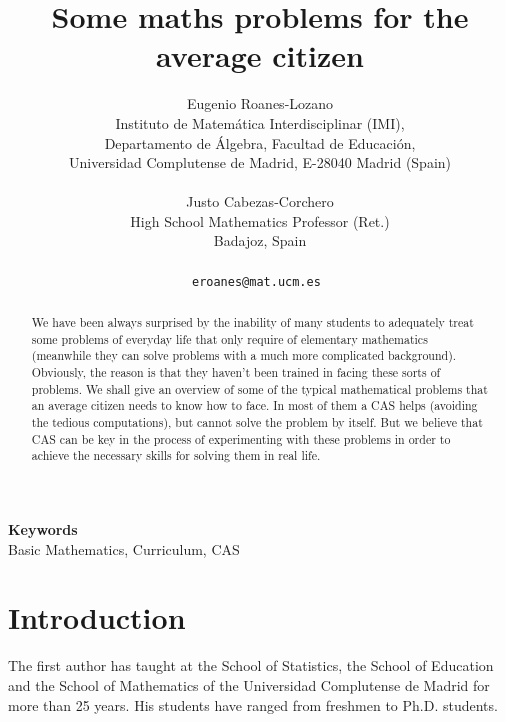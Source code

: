 \documentclass[a4paper]{article} %
\date{} %
\def\keywords#1{\begin{center}{\bf Keywords}\\{#1}\end{center}} %
\def\titulo#1{\title{#1}} %
\def\autores#1{\author{#1}} %
\begin{document}
\titulo{Some maths problems for the average citizen}

\autores{Eugenio Roanes-Lozano \\ %
       Instituto de Matem\'atica Interdisciplinar (IMI),\\
       Departamento de \'Algebra, Facultad de Educaci\'on, \\
       Universidad Complutense de Madrid, E-28040 Madrid (Spain) \\ \\
       Justo Cabezas-Corchero\\
       High School Mathematics Professor (Ret.)\\
       Badajoz, Spain\\ \\
       \tt{eroanes@mat.ucm.es} %
       }%


\maketitle

\thispagestyle{empty}




\begin{abstract}
We have been always surprised by the inability of many students
to adequately treat some problems of everyday life that only
require of elementary mathematics (meanwhile they can solve
problems with a much more complicated background). Obviously, the
reason is that they haven't been trained in facing these sorts of
problems. We shall give an overview of some of the
typical mathematical problems that an average citizen needs to
know how to face. In most of them a CAS helps (avoiding the
tedious computations), but cannot solve the problem by itself.
But we believe that CAS can be key in the process of
experimenting with these problems in order to achieve the
necessary skills for solving them in real life.
\end{abstract}

\keywords{Basic Mathematics, Curriculum, CAS} %


\section{Introduction}

The first author has taught at the School of Statistics, the
School of Education and the School of Mathematics of the
Universidad Complutense de Madrid for more than 25 years. His
students have ranged from freshmen to Ph.D. students.
\end{document}

